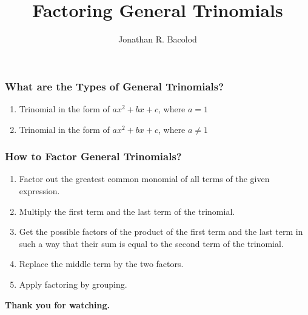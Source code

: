\documentclass[14pt]{beamer}
\title[] {Factoring General Trinomials}
\author{Jonathan R. Bacolod}
\institute[SHS]{Sauyo High School}
\date{}
\begin{document}
	\frame{\titlepage}
	
	\begin{frame}
		\frametitle{What are the Types of General Trinomials?}
		
		\begin{enumerate}
			\item<1-> Trinomial in the form of $ ax^2 + bx + c $, where $ a=1 $
			\item<2-> Trinomial in the form of $ ax^2 + bx + c $, where $ a \neq 1 $
		\end{enumerate}
	\end{frame}
	
	\begin{frame}
    	\frametitle{How to Factor General Trinomials?}
    	\begin{enumerate}
    		\item<1-> Factor out the greatest common monomial of all terms of the given expression.
    		\item<2-> Multiply the first term and the last term of the trinomial.  		
    		\item<3-> Get the possible factors of the product of the first term and the last term in such a way that their sum is equal to the second term of the trinomial.    		
    		\item<4-> Replace the middle term by the two factors.
    		\item<5-> Apply factoring by grouping.
    	\end{enumerate} 
    \end{frame}

    \begin{frame}
    	\begin{center}
    		\textbf{\LARGE Thank you for watching.}
    	\end{center}
    \end{frame}
	
\end{document}

